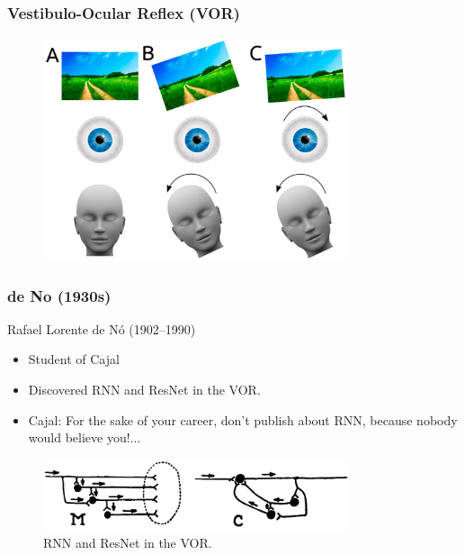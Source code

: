 \documentclass{beamer}
\begin{document}
\begin{frame}
\frametitle{Vestibulo-Ocular Reflex (VOR)}
\begin{figure}[t]
    \includegraphics[width=0.8\textwidth]{figure/vestibulo-ocular_reflex.png}
    \centering
\end{figure}
\end{frame}

\begin{frame}
\frametitle{de No (1930s)}
    Rafael Lorente de Nó (1902--1990)
    \begin{itemize}
        \item Student of Cajal
        \item Discovered RNN and ResNet in the VOR.
        \item Cajal: For the sake of your career, don't publish about RNN, because nobody would believe you!...
    \end{itemize}

    \begin{figure}[t]
        \includegraphics[width=0.8\textwidth]{figure/de_No_ResNet_RNN.png}
        \centering
        \caption{RNN and ResNet in the VOR. \cite{denoAnalysisActivityChains1938}}
    \end{figure}
    
\end{frame}
\end{document}
